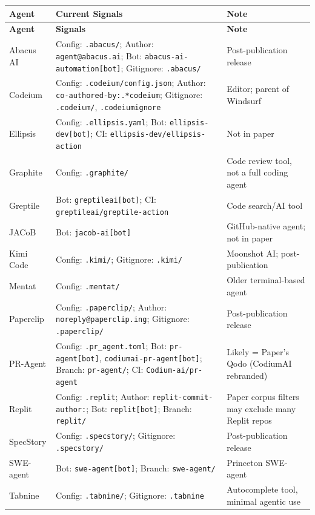 \documentclass[10pt,a4paper]{article}
\begin{document}
\begin{longtable}{L{3.2cm}L{5.5cm}L{4.8cm}}
\toprule
\textbf{Agent} & \textbf{Current Signals} & \textbf{Note} \\
\midrule\endfirsthead
\toprule\textbf{Agent}&\textbf{Signals}&\textbf{Note}\\\midrule\endhead\bottomrule\endlastfoot

Abacus AI & Config: \texttt{.abacus/}; Author: \texttt{agent@abacus.ai}; Bot: \texttt{abacus-ai-automation[bot]}; Gitignore: \texttt{.abacus/} & Post-publication release \\
Codeium & Config: \texttt{.codeium/config.json}; Author: \texttt{co-authored-by:.*codeium}; Gitignore: \texttt{.codeium/}, \texttt{.codeiumignore} & Editor; parent of Windsurf \\
Ellipsis & Config: \texttt{.ellipsis.yaml}; Bot: \texttt{ellipsis-dev[bot]}; CI: \texttt{ellipsis-dev/ellipsis-action} & Not in paper \\
Graphite & Config: \texttt{.graphite/} & Code review tool, not a full coding agent \\
Greptile & Bot: \texttt{greptileai[bot]}; CI: \texttt{greptileai/greptile-action} & Code search/AI tool \\
JACoB & Bot: \texttt{jacob-ai[bot]} & GitHub-native agent; not in paper \\
Kimi Code & Config: \texttt{.kimi/}; Gitignore: \texttt{.kimi/} & Moonshot AI; post-publication \\
Mentat & Config: \texttt{.mentat/} & Older terminal-based agent \\
Paperclip & Config: \texttt{.paperclip/}; Author: \texttt{noreply@paperclip.ing}; Gitignore: \texttt{.paperclip/} & Post-publication release \\
PR-Agent & Config: \texttt{.pr\_agent.toml}; Bot: \texttt{pr-agent[bot]}, \texttt{codiumai-pr-agent[bot]}; Branch: \texttt{pr-agent/}; CI: \texttt{Codium-ai/pr-agent} & Likely = Paper's Qodo (CodiumAI rebranded) \\
Replit & Config: \texttt{.replit}; Author: \texttt{replit-commit-author:}; Bot: \texttt{replit[bot]}; Branch: \texttt{replit/} & Paper corpus filters may exclude many Replit repos \\
SpecStory & Config: \texttt{.specstory/}; Gitignore: \texttt{.specstory/} & Post-publication release \\
SWE-agent & Bot: \texttt{swe-agent[bot]}; Branch: \texttt{swe-agent/} & Princeton SWE-agent \\
Tabnine & Config: \texttt{.tabnine/}; Gitignore: \texttt{.tabnine} & Autocomplete tool, minimal agentic use \\

\end{longtable}
\end{document}
